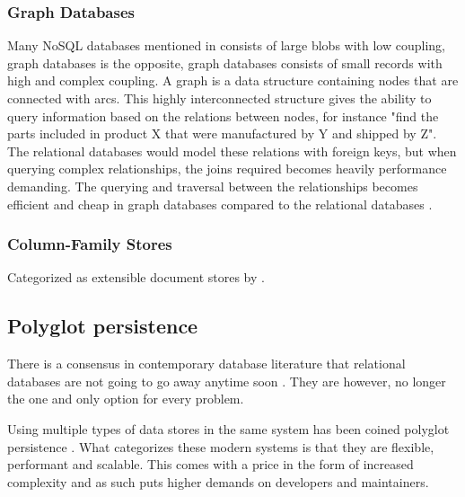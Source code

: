 \subsubsection{Graph Databases}

Many NoSQL databases mentioned in \cite{Catell} consists of large blobs with low coupling, graph databases is the opposite, graph databases consists of small records with high and complex coupling. A graph is a data structure containing nodes that are connected with arcs\cite{NoSQLDistilled}. This highly interconnected structure gives the ability to query information based on the relations between nodes, for instance "find the parts included in product X that were manufactured by Y and shipped by Z". The relational databases would model these relations with foreign keys, but when querying complex relationships, the joins required becomes heavily performance demanding. The querying and traversal between the relationships becomes efficient and cheap in graph databases compared to the relational databases \cite{NoSQLDistilled}.

\subsubsection{Column-Family Stores}
Categorized as extensible document stores by \cite{Catell}. 


\subsection{Polyglot persistence}
There is a consensus in contemporary database literature that relational databases are not going to go away anytime soon \cite{Catell, NoSQLDistilled, NoSQLSurvey}. They are however, no longer the one and only option for every problem. 


Using multiple types of data stores in the same system has been coined polyglot persistence \cite{NoSQLDistilled}. What categorizes these modern systems is that they are flexible, performant and scalable. This comes with a price in the form of increased complexity and as such puts higher demands on developers and maintainers. 

